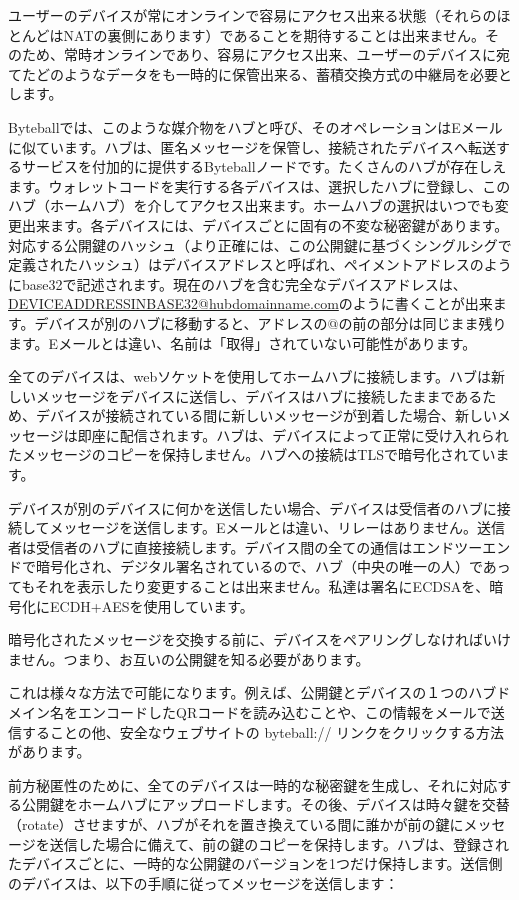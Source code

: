 \documentclass[a4paper, dvipdfmx]{jsarticle}
\begin{document}
ユーザーのデバイスが常にオンラインで容易にアクセス出来る状態（それらのほとんどはNATの裏側にあります）であることを期待することは出来ません。そのため、常時オンラインであり、容易にアクセス出来、ユーザーのデバイスに宛てたどのようなデータをも一時的に保管出来る、蓄積交換方式の中継局を必要とします。

Byteballでは、このような媒介物をハブと呼び、そのオペレーションはEメールに似ています。ハブは、匿名メッセージを保管し、接続されたデバイスへ転送するサービスを付加的に提供するByteballノードです。たくさんのハブが存在しえます。ウォレットコードを実行する各デバイスは、選択したハブに登録し、このハブ（ホームハブ）を介してアクセス出来ます。ホームハブの選択はいつでも変更出来ます。各デバイスには、デバイスごとに固有の不変な秘密鍵があります。対応する公開鍵のハッシュ（より正確には、この公開鍵に基づくシングルシグで定義されたハッシュ）はデバイスアドレスと呼ばれ、ペイメントアドレスのようにbase32で記述されます。現在のハブを含む完全なデバイスアドレスは、\href{DEVICEADDRESSINBASE32@hubdomainname.com}{DEVICEADDRESSINBASE32@hubdomainname.com}のように書くことが出来ます。デバイスが別のハブに移動すると、アドレスの@の前の部分は同じまま残ります。Eメールとは違い、名前は「取得」されていない可能性があります。

全てのデバイスは、webソケットを使用してホームハブに接続します。ハブは新しいメッセージをデバイスに送信し、デバイスはハブに接続したままであるため、デバイスが接続されている間に新しいメッセージが到着した場合、新しいメッセージは即座に配信されます。ハブは、デバイスによって正常に受け入れられたメッセージのコピーを保持しません。ハブへの接続はTLSで暗号化されています。

デバイスが別のデバイスに何かを送信したい場合、デバイスは受信者のハブに接続してメッセージを送信します。Eメールとは違い、リレーはありません。送信者は受信者のハブに直接接続します。デバイス間の全ての通信はエンドツーエンドで暗号化され、デジタル署名されているので、ハブ（中央の唯一の人）であってもそれを表示したり変更することは出来ません。私達は署名にECDSAを、暗号化にECDH+AESを使用しています。

暗号化されたメッセージを交換する前に、デバイスをペアリングしなければいけません。つまり、お互いの公開鍵を知る必要があります。

これは様々な方法で可能になります。例えば、公開鍵とデバイスの１つのハブドメイン名をエンコードしたQRコードを読み込むことや、この情報をメールで送信することの他、安全なウェブサイトの byteball:// リンクをクリックする方法があります。

前方秘匿性のために、全てのデバイスは一時的な秘密鍵を生成し、それに対応する公開鍵をホームハブにアップロードします。その後、デバイスは時々鍵を交替（rotate）させますが、ハブがそれを置き換えている間に誰かが前の鍵にメッセージを送信した場合に備えて、前の鍵のコピーを保持します。ハブは、登録されたデバイスごとに、一時的な公開鍵のバージョンを1つだけ保持します。送信側のデバイスは、以下の手順に従ってメッセージを送信します：
\end{document}
